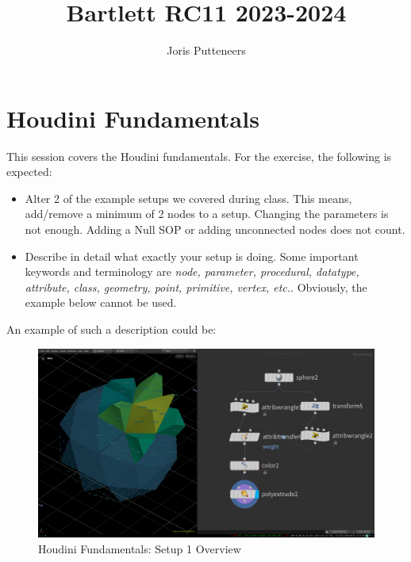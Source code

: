 \documentclass[11pt, a4paper]{article}
\begin{document}
\title{Bartlett RC11 2023-2024}
\author{Joris Putteneers}
\date{}
\maketitle

\section {Houdini Fundamentals}

This session covers the Houdini fundamentals. For the exercise, the following is expected:

\begin{itemize}
	\item Alter 2 of the example setups we covered during class. This means, add/remove a minimum of 2 nodes to a setup. Changing the parameters is not enough. Adding a Null SOP or adding unconnected nodes does not count.
	\item Describe in detail what exactly your setup is doing. Some important keywords and terminology are \textit{node, parameter, procedural, datatype, attribute, class, geometry, point, primitive, vertex, etc.}. Obviously, the example below cannot be used.
\end{itemize}

An example of such a description could be:

\begin{figure}[h]
	\centering
	\includegraphics[width=\textwidth]{media/houdini_fundamentals_overview.png}
	\caption{Houdini Fundamentals: Setup 1 Overview}
	\label{fig:assignment1}
\end{figure}
\end{document}
